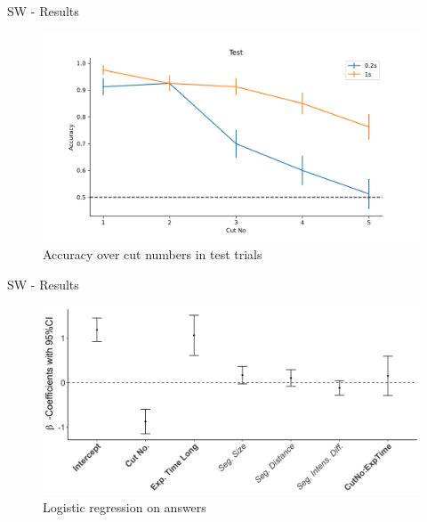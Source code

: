 \documentclass[10pt,xcolor=svgnames]{beamer} %
\begin{document}
\begin{frame}{SW - Results}
    \begin{figure}
        \hspace*{-1cm} 
        \centering
        \includegraphics[width = 1.1\textwidth]{pictures/sw_test.png}
        \caption{Accuracy over cut numbers in test trials}
        \label{fig:sw_test_acc}
    \end{figure}
\end{frame}

\begin{frame}{SW - Results}
    \begin{figure}
        \hspace*{-1cm} 
        \centering
        \includegraphics[width = \textwidth]{pictures/sw_test_coefficients_othrs_tgthr.png}
        \caption{Logistic regression on answers}
        \label{fig:sw_coefficients_test_othr}
    \end{figure}
\end{frame}
\end{document}
